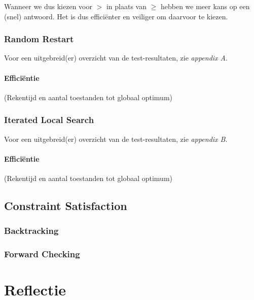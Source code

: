 \documentclass[]{report}
\begin{document}
Wanneer we dus kiezen voor $>$ in plaats van $\geq$ hebben we meer kans op een (snel) antwoord. Het is dus effici\"{e}nter en veiliger om daarvoor te kiezen.

\subsection{Random Restart}
Voor een uitgebreid(er) overzicht van de test-resultaten, zie \textit{appendix A}.
\subsubsection{Effici\"{e}ntie}
(Rekentijd en aantal toestanden tot globaal optimum)
\subsection{Iterated Local Search}
Voor een uitgebreid(er) overzicht van de test-resultaten, zie \textit{appendix B}.
\subsubsection{Effici\"{e}ntie}
(Rekentijd en aantal toestanden tot globaal optimum)
\section{Constraint Satisfaction}
\subsection{Backtracking}
\subsection{Forward Checking}

\chapter{Reflectie}
\end{document}
